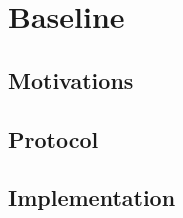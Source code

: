 \chapter{Baseline}\label{ch:baseline}

\section{Motivations}

\section{Protocol}

\section{Implementation}

